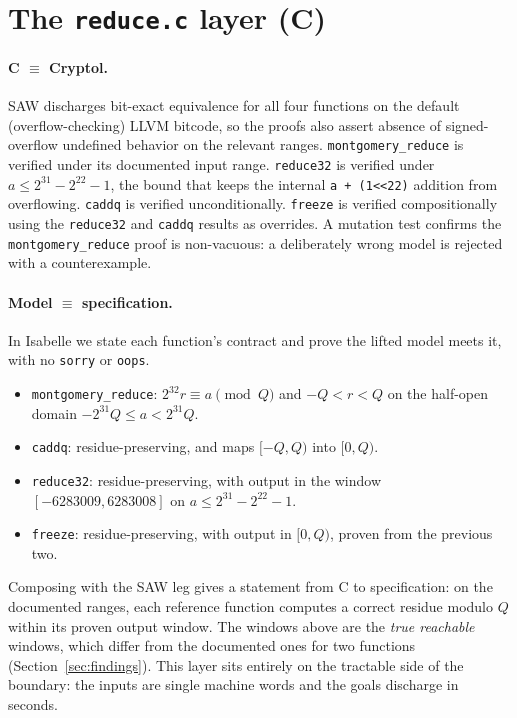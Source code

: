 \documentclass[journal=tches,submission,review]{iacrtrans}
\newcommand{\code}[1]{\texttt{#1}}
\begin{document}
\section{The \code{reduce.c} layer (C)}\label{sec:reduce}

\paragraph{C $\equiv$ Cryptol.} SAW discharges bit-exact equivalence for all four functions on the
default (overflow-checking) LLVM bitcode, so the proofs also assert absence of signed-overflow undefined
behavior on the relevant ranges. \code{montgomery\_reduce} is verified under its documented input range.
\code{reduce32} is verified under $a \le 2^{31} - 2^{22} - 1$, the bound that keeps the internal
\code{a + (1{<}{<}22)} addition from overflowing. \code{caddq} is verified unconditionally. \code{freeze}
is verified compositionally using the \code{reduce32} and \code{caddq} results as overrides. A mutation
test confirms the \code{montgomery\_reduce} proof is non-vacuous: a deliberately wrong model is rejected
with a counterexample.

\paragraph{Model $\equiv$ specification.} In Isabelle we state each function's contract and prove the
lifted model meets it, with no \code{sorry} or \code{oops}.
\begin{itemize}
  \item \code{montgomery\_reduce}: $2^{32} r \equiv a \pmod Q$ and $-Q < r < Q$ on the half-open domain
  $-2^{31} Q \le a < 2^{31} Q$.
  \item \code{caddq}: residue-preserving, and maps $[-Q, Q)$ into $[0, Q)$.
  \item \code{reduce32}: residue-preserving, with output in the window $[-6283009, 6283008]$ on
  $a \le 2^{31} - 2^{22} - 1$.
  \item \code{freeze}: residue-preserving, with output in $[0, Q)$, proven from the previous two.
\end{itemize}
Composing with the SAW leg gives a statement from C to specification: on the documented ranges, each
reference function computes a correct residue modulo $Q$ within its proven output window. The
windows above are the \emph{true reachable} windows, which differ from the documented ones for two
functions (Section~\ref{sec:findings}). This layer sits entirely on the tractable side of the boundary:
the inputs are single machine words and the goals discharge in seconds.
\end{document}
